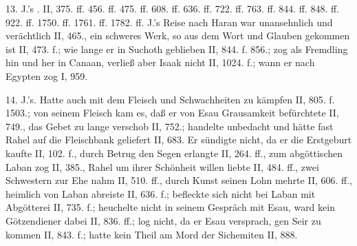 13. J.’s . II, 375. ff. 456. ff. 475. ff. 608. ff. 636. ff. 722. ff. 763. ff. 844. ff. 848. ff. 922. ff. 1750. ff. 1761. ff. 1782. ff. J.’s Reise nach Haran war unansehnlich und verächtlich II, 465., ein schweres Werk, so aus dem Wort und Glauben gekommen ist II, 473. f.; wie lange er in Suchoth geblieben II, 844. f. 856.; zog als Fremdling hin und her in Canaan, verließ aber Isaak nicht II, 1024. f.; wann er nach Egypten zog I, 959.

14.  J.’s. Hatte auch mit dem Fleisch und Schwachheiten zu kämpfen II, 805. f. 1503.; von seinem Fleisch kam es, daß er von Esau Grausamkeit befürchtete II, 749., das Gebet zu lange verschob II, 752.; handelte unbedacht und hätte fast Rahel auf die Fleischbank geliefert II, 683. Er sündigte nicht, da er die Erstgeburt kaufte II, 102. f., durch Betrug den Segen erlangte II, 264. ff., zum abgöttischen Laban zog II, 385., Rahel um ihrer Schönheit willen liebte II, 484. ff., zwei Schwestern zur Ehe nahm II, 510. ff., durch Kunst seinen Lohn mehrte II, 606. ff., heimlich von Laban abreiste II, 636. f.; befleckte sich nicht bei Laban mit Abgötterei II, 735. f.; heuchelte nicht in seinem Gespräch mit Esau, ward kein Götzendiener dabei II, 836. ff.; log nicht, da er Esau versprach, gen Seir zu kommen II, 843. f.; hatte kein Theil am Mord der Sichemiten II, 888.

